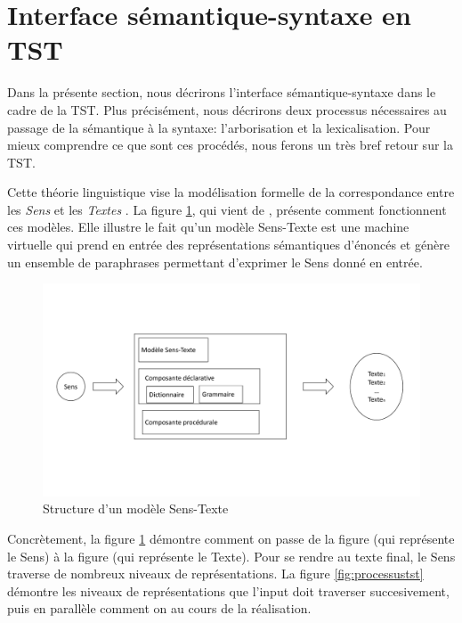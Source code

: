 \section{Interface sémantique-syntaxe en TST}\label{sec:semsynt}

Dans la présente section, nous décrirons l'interface sémantique-syntaxe dans le cadre de la \ac{TST}. Plus précisément, nous décrirons deux processus nécessaires au passage de la sémantique à la syntaxe: l'arborisation et la lexicalisation. Pour mieux comprendre ce que sont ces procédés, nous ferons un très bref retour sur la \ac{TST}. 

Cette théorie linguistique vise la modélisation formelle de la correspondance entre les \emph{Sens} et les \emph{Textes} \citep{PolgueretheorieSensTexte1998, MelcukVerslinguistiqueSensTexte1997, DBLP:conf/coling/JolkovskyM67}. La figure \ref{fig:modeletst}, qui vient de \cite{PolgueretheorieSensTexte1998}, présente comment fonctionnent ces modèles. Elle illustre le fait qu'un modèle Sens-Texte est une machine virtuelle qui prend en entrée des représentations sémantiques d'énoncés et génère un ensemble de paraphrases permettant d'exprimer le Sens donné en entrée. 

\begin{figure}[htb]
	\centering
	\includegraphics[width=1\textwidth, trim = {0cm 4cm 0cm 4cm},clip]{ch3/figs/polguere1.pdf}
	\caption{Structure d'un modèle Sens-Texte \citep{PolgueretheorieSensTexte1998}}
	\label{fig:modeletst}
\end{figure}

Concrètement, la figure \ref{fig:modeletst} démontre comment on passe de la figure  (qui représente le Sens) à la figure  (qui représente le Texte). Pour se rendre au texte final, le Sens traverse de nombreux niveaux de représentations. La figure \ref{fig:processustst} démontre les niveaux de représentations que l'input doit traverser succesivement, puis en parallèle comment on  au cours de la réalisation.

